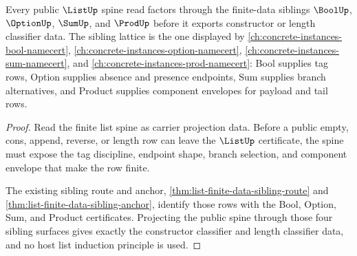 \begin{theorem}
\label{thm:list-finite-data-sibling-lattice}
Every public $\ListUp$ spine read factors through the finite-data siblings
$\BoolUp$, $\OptionUp$, $\SumUp$, and $\ProdUp$ before it exports constructor or
length classifier data. The sibling lattice is the one displayed by
\autoref{ch:concrete-instances-bool-namecert},
\autoref{ch:concrete-instances-option-namecert},
\autoref{ch:concrete-instances-sum-namecert}, and
\autoref{ch:concrete-instances-prod-namecert}: Bool supplies tag rows, Option
supplies absence and presence endpoints, Sum supplies branch alternatives, and
Product supplies component envelopes for payload and tail rows.
\end{theorem}
\begin{proof}
Read the finite list spine as carrier projection data. Before a public empty,
cons, append, reverse, or length row can leave the $\ListUp$ certificate, the
spine must expose the tag discipline, endpoint shape, branch selection, and
component envelope that make the row finite.

The existing sibling route and anchor,
\autoref{thm:list-finite-data-sibling-route} and
\autoref{thm:list-finite-data-sibling-anchor}, identify those rows with the Bool,
Option, Sum, and Product certificates. Projecting the public spine through those
four sibling surfaces gives exactly the constructor classifier and length
classifier data, and no host list induction principle is used.
\end{proof}
